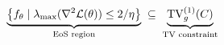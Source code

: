 \documentclass[preview]{standalone}
\begin{document}
\begin{align*}
\special{dvisvgm:raw <g id='unique000'>}\underbrace{\left\{f_\theta\mid\lambda_{\max}(\nabla^2\mathcal{L}(\theta))\le2/\eta\right\}}_{\text{EoS region}}\;\subseteq\;\underbrace{\mathrm{TV}_g^{(1)}(C)}_{\text{TV constraint}}\special{dvisvgm:raw </g>}
\end{align*}
\end{document}
